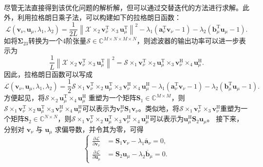 尽管无法直接得到该优化问题的解析解，但可以通过交替迭代的方法进行求解。此外，利用拉格朗日乘子法，可以构建如下的拉格朗日函数：
\[
    \mathcal{L}(\bm{v}_{\nu}, \bm{u}_{\mu}, \lambda_1, \lambda_2)
    = \frac{1}{2L} \left\| \mathcal{X} \times_2 \bm{v}_{\nu}^{\mathrm{T}} \times_3 \bm{u}_{\mu}^{\mathrm{T}} \right\|^2
    - \lambda_1 \left( \bm{a}^{\mathrm{T}}_{\nu} \bm{v}_{\nu} - 1 \right)
    - \lambda_2 \left( \bm{b}^{\mathrm{T}}_{\mu} \bm{u}_{\mu} - 1 \right).
\]
如将\( \mathbf{\Sigma}_{23} \)转换为一个4阶张量\( \mathcal{S} \in \mathbb{C}^{M \times N \times M \times N} \)，则滤波器的输出功率可以进一步表示为
\[
    \frac{1}{L} \left\| \mathcal{X} \times_2 \bm{v}_{\nu}^{\mathrm{T}} \times_3 \bm{u}_{\mu}^{\mathrm{T}} \right\|^2 = \mathcal{S} \times_1 \bm{v}_{\nu}^{\mathrm{T}} \times_2 \bm{u}_{\mu}^{\mathrm{T}} \times_3 \bm{v}_{\nu}^{\mathrm{H}} \times_4 \bm{u}_{\mu}^{\mathrm{H}}.
\]
因此，拉格朗日函数可以写成
\[
    \mathcal{L}(\bm{v}_{\nu}, \bm{u}_{\mu}, \lambda_1, \lambda_2)
    = \frac{1}{2}\mathcal{S} \times_1 \bm{v}_{\nu}^{\mathrm{T}} \times_2 \bm{u}_{\mu}^{\mathrm{T}} \times_3 \bm{v}_{\nu}^{\mathrm{H}} \times_4 \bm{u}_{\mu}^{\mathrm{H}}
    - \lambda_1 \left( \bm{a}^{\mathrm{T}}_{\nu} \bm{v}_{\nu} - 1 \right)
    - \lambda_2 \left( \bm{b}^{\mathrm{T}}_{\mu} \bm{u}_{\mu} - 1 \right).
\]
方便起见，将\(\mathcal{S} \times_2 \bm{u}_{\mu}^{\mathrm{T}} \times_4 \bm{u}_{\mu}^{\mathrm{H}}\) 重塑为一个矩阵\( \mathbf{S}_{1} \in \mathbb{C}^{M \times M} \)，则\(  \mathcal{S} \times_1 \bm{v}_{\nu}^{\mathrm{T}} \times_2 \bm{u}_{\mu}^{\mathrm{T}} \times_3 \bm{v}_{\nu}^{\mathrm{H}} \times_4 \bm{u}_{\mu}^{\mathrm{H}} \)可以表示为\(\bm{v}_{\nu}^{\mathrm{H}} \mathbf{S}_1 \bm{v}_{\nu}\)。类似地，将\(\mathcal{S} \times_1 \bm{v}_{\nu}^{\mathrm{T}} \times_3 \bm{v}_{\nu}^{\mathrm{H}}\)重塑为一个矩阵\( \mathbf{S}_{2} \in \mathbb{C}^{N \times N} \)，则\(  \mathcal{S} \times_1 \bm{v}_{\nu}^{\mathrm{T}} \times_2 \bm{u}_{\mu}^{\mathrm{T}} \times_3 \bm{v}_{\nu}^{\mathrm{H}} \times_4 \bm{u}_{\mu}^{\mathrm{H}} \)可以表示为\(\bm{u}_{\mu}^{\mathrm{H}} \mathbf{S}_2 \bm{u}_{\mu}\)。
接下来，分别对 \( \bm{v}_{\nu} \) 与 \( \bm{u}_{\mu} \) 求偏导数，并令其为零，可得
\[
    \begin{cases}
        \frac{\partial \mathcal{L}}{\partial \bm{v}_{\nu}}
         & = \mathbf{S}_1 \bm{v}_{\nu} - \lambda_1 \overline{\bm{a}}_{\nu} = 0, \\
        \frac{\partial \mathcal{L}}{\partial \bm{u}_{\mu}}
         & = \mathbf{S}_2 \bm{u}_{\mu} - \lambda_2 \overline{\bm{b}}_{\mu} = 0.
    \end{cases}
\]
